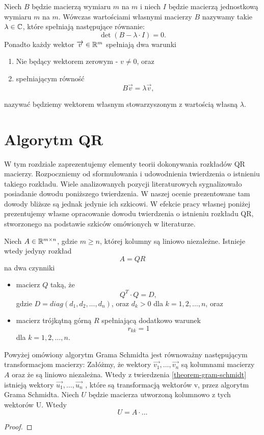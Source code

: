 \documentclass[10pt,a4paper]{report}
\newcommand{\vr}[1]{\overrightarrow{#1}}%
\newcommand{\mx}[1]{{#1}}
\begin{document}
\begin{definition}
Niech $B$ będzie macierzą wymiaru $m$ na $m$ i niech $I$ będzie macierzą jednostkową wymiaru $m$ na $m$. Wówczas wartościami własnymi macierzy $B$ nazywamy takie $\lambda \in \mathbb{C}$, które spełniają następujące równanie:
$$
\det (\mx{B}-\lambda\cdot \mx{I})=0. 
$$ 
Ponadto każdy wektor $\vr{v} \in \setR^m$ spełniają dwa warunki
\begin{enumerate}
\item Nie będący wektorem zerowym - $v \neq 0$, oraz
\item spełniającym równość
$$
\mx{B} \vr{v} = \lambda \vr{v},
$$
\end{enumerate}
nazywać będziemy wektorem własnym stowarzyszonym z wartością własną $\lambda$.
\end{definition}

\chapter{Algorytm QR}

W tym rozdziale zaprezentujemy elementy teorii dokonywania rozkładów QR macierzy. Rozpoczniemy od sformułowania i udowodnienia twierdzenia o istnieniu takiego rozkładu. Wiele analizowanych pozycji literaturowych sygnalizowało posiadanie dowodu poniższego twierdzenia. W naszej ocenie prezentowane tam dowody bliższe są jednak jedynie ich szkicowi. W efekcie pracy własnej poniżej prezentujemy własne opracowanie dowodu twierdzenia o istnieniu rozkładu QR, stworzonego na podstawie szkiców omówionych w literaturze. 

\begin{theorem}[O rozkładzie QR]\label{theorem-qr-docomposition}
Niech $\mx{A} \in \setR^{m \times n}$, gdzie $m\ge n$, której kolumny są liniowo niezależne. Istnieje wtedy jedyny rozkład 
$$
\mx{A} = \mx{Q} \mx{R}
$$ 
na dwa czynniki
\begin{itemize}
\item macierz $\mx{Q}$ taką, że 
$$
Q^{T}\cdot Q=D,
$$
gdzie $D= diag (d_{1}, d_{2}, ..., d_{n})$, oraz $d_{k}>0$ dla $k = 1, 2, \ldots, n$, oraz
\item macierz trójkątną górną $\mx{R}$ spełniającą dodatkowo warunek 
$$
r_{kk}= 1 
$$ 
dla $k = 1, 2, \ldots, n$.
\end{itemize} 
\end{theorem}


\begin{lemma}
Powyżej omówiony algorytm Grama Schmidta jest równoważny następującym transformacjom macierzy: Załóżmy, że wektory $\vr{v_1}, \ldots, \vr{v_n}$ są kolumnami macierzy $\mx{A}$ oraz że są liniowo niezależna. Wtedy z twierdzenia \ref{theorem-gram-schmidt} istnieją wektory $\vr{u_1}, \ldots, \vr{u_n}$ , które są transformacją wektorów v, przez algorytm Grama Schmidta. Niech $\mx{U}$ będzie macierza utworzoną kolumnowo z tych wektorów U. Wtedy
$$
U = A \cdot \ldots
$$
\end{lemma}
\begin{proof}

\end{proof}
\end{document}
